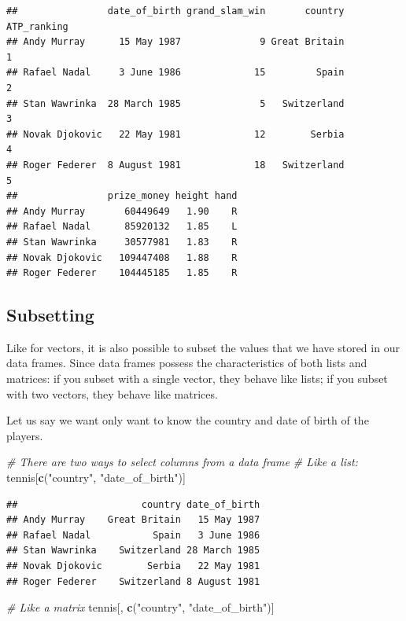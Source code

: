 \documentclass[12pt,]{krantz}
\newenvironment{Shaded}{\begin{snugshade}}{\end{snugshade}}
\newcommand{\KeywordTok}[1]{\textcolor[rgb]{0.27,0.27,0.27}{\textbf{#1}}}
\newcommand{\StringTok}[1]{\textcolor[rgb]{0.5,0.5,0.5}{#1}}
\newcommand{\CommentTok}[1]{\textcolor[rgb]{0.37,0.37,0.37}{\textit{#1}}}
\newcommand{\NormalTok}[1]{#1}
\begin{document}
\begin{verbatim}
##                date_of_birth grand_slam_win       country ATP_ranking
## Andy Murray      15 May 1987              9 Great Britain           1
## Rafael Nadal     3 June 1986             15         Spain           2
## Stan Wawrinka  28 March 1985              5   Switzerland           3
## Novak Djokovic   22 May 1981             12        Serbia           4
## Roger Federer  8 August 1981             18   Switzerland           5
##                prize_money height hand
## Andy Murray       60449649   1.90    R
## Rafael Nadal      85920132   1.85    L
## Stan Wawrinka     30577981   1.83    R
## Novak Djokovic   109447408   1.88    R
## Roger Federer    104445185   1.85    R
\end{verbatim}

\subsection{Subsetting}\label{subsetting-2}

Like for vectors, it is also possible to subset the values that we have
stored in our data frames. Since data frames possess the characteristics
of both lists and matrices: if you subset with a single vector, they
behave like lists; if you subset with two vectors, they behave like
matrices.

Let us say we want only want to know the country and date of birth of
the players.

\begin{Shaded}
\begin{Highlighting}[]
\CommentTok{# There are two ways to select columns from a data frame}
\CommentTok{# Like a list:}
\NormalTok{tennis[}\KeywordTok{c}\NormalTok{(}\StringTok{"country"}\NormalTok{, }\StringTok{"date_of_birth"}\NormalTok{)]}
\end{Highlighting}
\end{Shaded}

\begin{verbatim}
##                      country date_of_birth
## Andy Murray    Great Britain   15 May 1987
## Rafael Nadal           Spain   3 June 1986
## Stan Wawrinka    Switzerland 28 March 1985
## Novak Djokovic        Serbia   22 May 1981
## Roger Federer    Switzerland 8 August 1981
\end{verbatim}

\begin{Shaded}
\begin{Highlighting}[]
\CommentTok{# Like a matrix}
\NormalTok{tennis[, }\KeywordTok{c}\NormalTok{(}\StringTok{"country"}\NormalTok{, }\StringTok{"date_of_birth"}\NormalTok{)]}
\end{Highlighting}
\end{Shaded}
\end{document}
